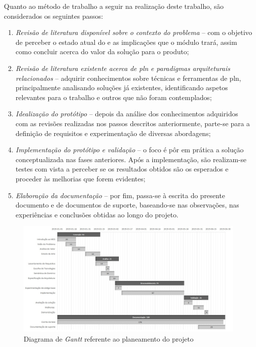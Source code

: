 Quanto ao método de trabalho a seguir na realização deste trabalho, são considerados os seguintes passos:

\begin{enumerate}
    \item 
    {
        \textit{Revisão de literatura disponível sobre o contexto do problema} -- com o objetivo de perceber o estado atual do {\productname} e as implicações que o módulo trará, assim como concluir acerca do valor da solução para o produto;
    }
    \item
    {
        \textit{Revisão de literatura existente acerca de \gls{pln} e paradigmas arquiteturais relacionados} -- adquirir conhecimentos sobre técnicas e ferramentas de \gls{pln}, principalmente analisando soluções já existentes, identificando aspetos relevantes para o trabalho e outros que não foram contemplados;
    }
    \item
    {
        \textit{Idealização do protótipo} -- depois da análise dos conhecimentos adquiridos com as revisões realizadas nos passos descritos anteriormente,
        parte-se para a definição de requisitos e experimentação de diversas abordagens;
    }
    \item
    {
        \textit{Implementação do protótipo e validação} -- o foco é pôr em prática a solução conceptualizada nas fases anteriores. Após a implementação, são realizam-se testes com vista a perceber se os resultados obtidos são os esperados e proceder às melhorias que forem evidentes;
    }
    \item
    {
        \textit{Elaboração da documentação} --  por fim, passa-se à escrita do presente documento e de documentos de suporte, baseando-se nas observações, nas experiências e conclusões obtidas ao longo do projeto.
    }
\end{enumerate}

\begin{figure}
    \centering
    \includegraphics[width=\textwidth]{ch01/assets/gantt.jpg}
    \caption{Diagrama de \textit{Gantt} referente ao planeamento do projeto}
    \label{fig:planning-gantt_chart}
\end{figure}
